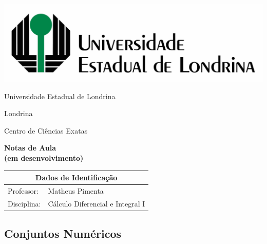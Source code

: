 \documentclass[oneside,a4paper,12pt]{article}
\newcommand{\universidade}{Universidade Estadual de Londrina}
\newcommand{\centro}{Londrina}
\newcommand{\departamento}{Centro de Ciências Exatas}
\newcommand{\curso}{Turma Especial}
\newcommand{\professores}{Matheus Pimenta}
\newcommand{\disciplina}{Cálculo Diferencial e Integral I}
\begin{document}
	
	\begin{center}
		\includegraphics[width=\linewidth/2]{logo.jpg}%
	 	\vspace{2pt} 	
		
		\universidade
		\par
		\centro
		\par
		\departamento
		\par
		\par
		\vspace{12pt}
		\LARGE \textbf{Notas de Aula \\ (em desenvolvimento)}
		
	\end{center}
	
	\vspace{12pt}
	
	\begin{tabular}{ |l|p{12cm}| }
		
		\hline
		\multicolumn{2}{|c|}{\textbf{Dados de Identificação}} \\
		\hline
		Professor:         &    \professores           \\
		\hline
		Disciplina:        &    \disciplina          \\
		\hline
		
	\end{tabular}
	\vspace{6pt}
	
	
	\begin{snugshade}
		\section{Conjuntos Numéricos}
	\end{snugshade}
\end{document}
